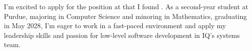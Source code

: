 



I'm excited to apply for the \position\;position at \company\;that I found \source. As a second-year student at Purdue, majoring in Computer Science and minoring in Mathematics, graduating in May 2028, I'm eager to work in a fast-paced environment and apply my leadership skills and passion for low-level software development in IQ's systems team.
